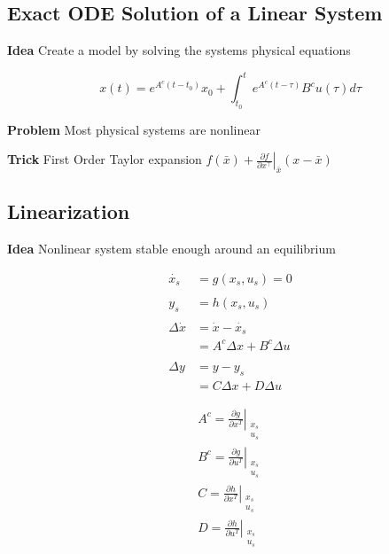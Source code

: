 

\subsection{Exact ODE Solution of a Linear System}

\textbf{Idea}
Create a model by solving the systems physical equations

\[
	x(t) = e^{A^c(t-t_0)}x_0 +
	\textstyle\int_{t_0}^{t}e^{A^c(t-\tau)}B^c u(\tau)d\tau
\]

\textbf{Problem}
Most physical systems are nonlinear

\textbf{Trick}
First Order Taylor expansion
$f(\bar{x}) + \left. \frac{\partial f}{\partial x^\top} \right
	\rvert_{\bar{x}} (x-\bar{x})$

\subsection{Linearization}
\textbf{Idea}
Nonlinear system  stable enough around an equilibrium

\begin{minipage}[t]{0.5\linewidth}
	\vspace{1mm}
	\begin{align*}
		\dot{x_s}      & =g(x_s,u_s) = 0             \\ \\
		y_s            & = h(x_s,u_s)                \\
		\\
		\Delta \dot{x} & =\dot{x} -\dot{x_s}         \\
		               & = A^c\Delta x + B^c\Delta u \\ \\
		\Delta y       & = y - y_s                   \\
		               & = C\Delta x + D\Delta u
	\end{align*}
\end{minipage}
\begin{minipage}[t]{0.4\linewidth}
	\begin{align*}
		A^c  = \left.\frac{\partial g}{\partial x^T}\right|
		_{\substack{x_s \\u_s}}\\
		B^c  = \left.\frac{\partial g}{\partial u^T}\right|
		_{\substack{x_s \\u_s}}\\
		C    = \left.\frac{\partial h}{\partial x^T}\right|
		_{\substack{x_s \\u_s}}\\
		D    = \left.\frac{\partial h}{\partial u^T}\right|
		_{\substack{x_s \\u_s}}\\
	\end{align*}
\end{minipage}


